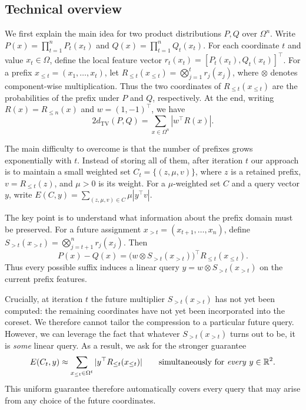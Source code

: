 \documentclass{article}
\begin{document}
\subsection{Technical overview}
\label{sec:technical-overview}

We first explain the main idea for two product distributions
$P,Q$ over $\Omega^n$.  Write
$P(x)=\prod_{t=1}^n P_t(x_t)$ and
$Q(x)=\prod_{t=1}^n Q_t(x_t)$.
For each coordinate $t$ and value $x_t\in\Omega$, define the local
feature vector
$r_t(x_t)=[P_t(x_t),Q_t(x_t)]^\top$.
For a prefix $x_{\leq t}=(x_1,\ldots,x_t)$, let
$R_{\leq t}(x_{\leq t})
=\bigotimes_{j=1}^t r_j(x_j)$,
where $\otimes$ denotes component-wise multiplication.  Thus the two
coordinates of $R_{\leq t}(x_{\leq t})$ are the probabilities of the
prefix under $P$ and $Q$, respectively.  At the end, writing
$R(x)=R_{\leq n}(x)$ and $w=(1,-1)^\top$, we have
\[
    2d_{\mathrm{TV}}(P,Q)
    =
    \sum_{x\in\Omega^n}
    |w^\top R(x)|.
\]

The main difficulty to overcome is that the number of prefixes grows exponentially with
$t$.  
Instead of storing all of them, after iteration $t$ our approach is to maintain a small weighted set
$C_t=\{(z,\mu,v)\}$, where $z$ is a retained prefix,
$v=R_{\leq t}(z)$, and $\mu>0$ is its weight.  For a $\mu$-weighted set $C$
and a query vector $y$, write
$E(C,y)=\sum_{(z,\mu,v)\in C}\mu|y^\top v|$.

The key point is to understand what information about the prefix domain
must be preserved.  For a future assignment
$x_{>t}=(x_{t+1},\ldots,x_n)$, define
$S_{>t}(x_{>t})
=\bigotimes_{j=t+1}^n r_j(x_j)$.
Then
\[
    P(x)-Q(x)
    =
    \bigl(w\otimes S_{>t}(x_{>t})\bigr)^\top
    R_{\leq t}(x_{\leq t}).
\]
Thus every possible suffix induces a linear query
$y=w\otimes S_{>t}(x_{>t})$ on the current prefix features.

Crucially, at iteration $t$ the future multiplier
$S_{>t}(x_{>t})$ has not yet been computed: the remaining coordinates have not yet
been incorporated into the coreset.  
We therefore cannot tailor the
compression to a particular future query.  
However, we can leverage the fact that whatever $S_{>t}(x_{>t})$ turns out to be, it is \textit{some} linear query. 
As a result, we ask for the stronger guarantee
\[
    E(C_t,y)
    \approx
    \sum_{x_{\leq t}\in\Omega^t}
    |y^\top R_{\leq t}(x_{\leq t})|
    \qquad
    \text{simultaneously for \textit{every} }y\in\mathbb{R}^2.
\]
This uniform guarantee therefore automatically covers every query that may arise from any choice of the future coordinates.
\end{document}
